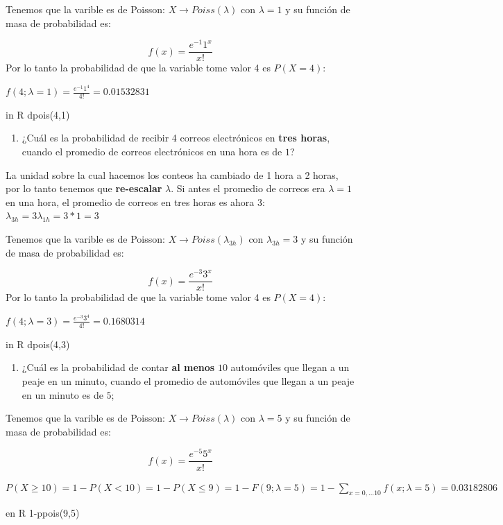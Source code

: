 \documentclass[
]{book}
\providecommand{\tightlist}{%
  \setlength{\itemsep}{0pt}\setlength{\parskip}{0pt}}
\begin{document}
Tenemos que la varible es de Poisson: \(X \rightarrow Poiss(\lambda)\) con \(\lambda=1\) y su función de masa de probabilidad es:

\[f(x)= \frac{e^{-1}1^x}{x!}\]
Por lo tanto la probabilidad de que la variable tome valor 4 es \(P(X=4)\):

\(f(4; \lambda=1)= \frac{e^{-1}1^4}{4!}=0.01532831\)

in R dpois(4,1)

\begin{enumerate}
\def\labelenumi{\arabic{enumi})}
\setcounter{enumi}{1}
\tightlist
\item
  ¿Cuál es la probabilidad de recibir 4 correos electrónicos en \textbf{tres horas}, cuando el promedio de correos electrónicos en una hora es de \(1\)?
\end{enumerate}

La unidad sobre la cual hacemos los conteos ha cambiado de 1 hora a 2 horas, por lo tanto tenemos que \textbf{re-escalar} \(\lambda\). Si antes el promedio de correos era \(\lambda=1\) en una hora, el promedio de correos en tres horas es ahora 3: \(\lambda_{3h}=3\lambda_{1h}=3*1=3\)

Tenemos que la varible es de Poisson: \(X \rightarrow Poiss(\lambda_{3h})\) con \(\lambda_{3h}=3\) y su función de masa de probabilidad es:

\[f(x)= \frac{e^{-3}3^x}{x!}\]
Por lo tanto la probabilidad de que la variable tome valor 4 es \(P(X=4)\):

\(f(4; \lambda=3)= \frac{e^{-3}3^4}{4!}=0.1680314\)

in R dpois(4,3)

\begin{enumerate}
\def\labelenumi{\arabic{enumi})}
\setcounter{enumi}{2}
\tightlist
\item
  ¿Cuál es la probabilidad de contar \textbf{al menos} \(10\) automóviles que llegan a un peaje en un minuto, cuando el promedio de automóviles que llegan a un peaje en un minuto es de \(5\);
\end{enumerate}

Tenemos que la varible es de Poisson: \(X \rightarrow Poiss(\lambda)\) con \(\lambda=5\) y su función de masa de probabilidad es:

\[f(x)= \frac{e^{-5}5^x}{x!}\]

\(P(X\geq 10)=1-P(X < 10)=1-P(X \leq 9)=1-F(9; \lambda=5)=1-\sum_{x=0, ...10}f(x; \lambda=5)=0.03182806\)

en R 1-ppois(9,5)
\end{document}
